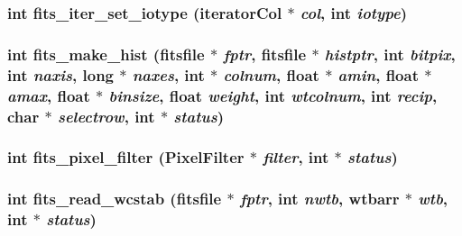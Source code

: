 \subsubsection{\setlength{\rightskip}{0pt plus 5cm}int fits\_\-iter\_\-set\_\-iotype (\bf{iterator\-Col} $\ast$ {\em col}, int {\em iotype})}\label{fitsio_8h_fc4975d9887977031dd0df029b37bda1}


\subsubsection{\setlength{\rightskip}{0pt plus 5cm}int fits\_\-make\_\-hist (\bf{fitsfile} $\ast$ {\em fptr}, \bf{fitsfile} $\ast$ {\em histptr}, int {\em bitpix}, int {\em naxis}, long $\ast$ {\em naxes}, int $\ast$ {\em colnum}, float $\ast$ {\em amin}, float $\ast$ {\em amax}, float $\ast$ {\em binsize}, float {\em weight}, int {\em wtcolnum}, int {\em recip}, char $\ast$ {\em selectrow}, int $\ast$ {\em status})}\label{fitsio_8h_3f352373829dc5bb502287246017a0da}


\subsubsection{\setlength{\rightskip}{0pt plus 5cm}int fits\_\-pixel\_\-filter (\bf{Pixel\-Filter} $\ast$ {\em filter}, int $\ast$ {\em status})}\label{fitsio_8h_69443475c41bee4c7f7f88c4f03677b5}


\subsubsection{\setlength{\rightskip}{0pt plus 5cm}int fits\_\-read\_\-wcstab (\bf{fitsfile} $\ast$ {\em fptr}, int {\em nwtb}, \bf{wtbarr} $\ast$ {\em wtb}, int $\ast$ {\em status})}\label{fitsio_8h_96c804d78d44901bc5d497b30e47b7ad}


